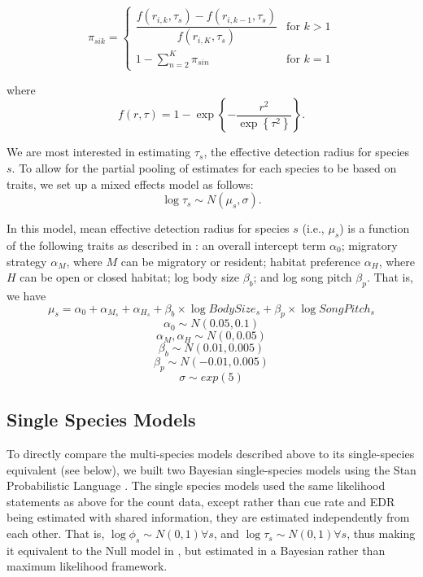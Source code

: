 \documentclass[12pt]{article}
\begin{document}
\begin{equation*}
	\pi_{sik} = 
	\begin{cases}
		\dfrac{f(r_{i,k}, \tau_s) - f(r_{i,k-1}, \tau_s)}{f(r_{i,K}, \tau_s)} & \text{for } k > 1 \\
		1 - \sum_{n = 2}^{K} \pi_{sin} & \text{for } k = 1
	\end{cases}
\end{equation*}

where 
$$f(r,\tau) =  1 - \exp\left\{ -\dfrac{r^2}{\exp\left\{\tau^2\right\}} \right\} .$$

\par We are most interested in estimating $\tau_s$, the effective detection radius for species $s$. 
To allow for the partial pooling of estimates for each species to be based on traits, we set up a mixed effects model as follows:
$$\log \tau_s \sim N(\mu_s, \sigma).$$

\par In this model, mean effective detection radius for species $s$ (i.e., $\mu_s$) is a function of the following traits as described in \cite{solymos_phylogeny_2018}: an overall intercept term $\alpha_0$; migratory strategy $\alpha_M$, where $M$ can be migratory or resident; habitat preference $\alpha_H$, where $H$ can be open or closed habitat; log body size $\beta_b$; and log song pitch $\beta_p$. 
That is, we have
$$ \mu_s = \alpha_0 + \alpha_{M_s} + \alpha_{H_s} + \beta_b \times \log BodySize_s + \beta_p \times \log SongPitch_s$$
$$\alpha_0 \sim N(0.05, 0.1)$$
$$ \alpha_M, \alpha_H \sim N(0, 0.05)$$
$$ \beta_b \sim N(0.01, 0.005)$$
$$ \beta_p \sim N(-0.01, 0.005) $$
$$\sigma \sim exp(5)$$

\subsection{Single Species Models}

\par To directly compare the multi-species models described above to its single-species equivalent (see below), we built two Bayesian single-species models using the Stan Probabilistic Language \citep{stan_development_team_stan_2024}.
The single species models used the same likelihood statements as above for the count data, except rather than cue rate and EDR being estimated with shared information, they are estimated independently from each other.
That is, $\log \phi_s \sim N(0,1) \forall s$, and $\log \tau_s \sim N(0,1) \forall s$, thus making it equivalent to the Null model in \citet{edwards_point_2023}, but estimated in a Bayesian rather than maximum likelihood framework. 
\end{document}
